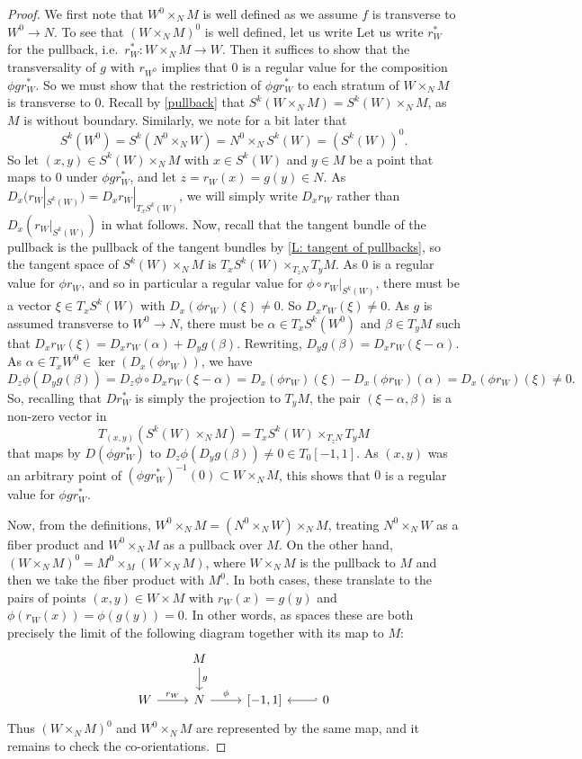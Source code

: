\documentclass[12pt]{article}
\theoremstyle{plain}
\theoremstyle{definition}
\theoremstyle{remark}
\begin{document}
\begin{proof}
	We first note that $W^0 \times_N M$ is well defined as we assume $f$ is transverse to $W^0 \to N$.
	To see that $(W \times_N M)^0$ is well defined, let us write Let us write $r_W^*$ for the pullback, i.e.\ $r_W^* \colon W \times_N M \to W$.
	Then it suffices to show that the transversality of $g$ with $r_{W^0}$ implies that $0$ is a regular value for the composition $\phi g r_W^*$.
	So we must show that the restriction of $\phi gr_W^*$ to each stratum of $W \times_N M$ is transverse to $0$.
	Recall by \cref{pullback} that $S^k(W \times_N M) = S^k(W) \times_N M$, as $M$ is without boundary.
	Similarly, we note for a bit later that $$S^k(W^0) = S^k(N^0 \times_N W) = N^0 \times_N S^k(W) = (S^k(W))^0.$$
	So let $(x,y) \in S^k(W) \times_N M$ with $x \in S^k(W)$ and $y \in M$ be a point that maps to $0$ under $\phi gr_W^*$, and let $z = r_W(x) = g(y) \in N$.
	As $D_x(r_W|_{S^k(W)}) = D_xr_W|_{T_xS^k(W)}$, we will simply write $D_xr_W$ rather than $D_x(r_W|_{S^k(W)})$ in what follows.
	Now, recall that the tangent bundle of the pullback is the pullback of the tangent bundles by \cref{L: tangent of pullbacks}, so the tangent space of $S^k(W) \times_N M$ is $T_x S^k(W) \times_{T_{z}N} T_yM$.
	As $0$ is a regular value for $\phi r_W$, and so in particular a regular value for $\phi \circ r_W|_{S^k(W)}$, there must be a vector $\xi \in T_xS^k(W)$ with $D_x(\phi r_W)(\xi)\neq 0$.
	So $D_xr_W(\xi) \neq 0$.
	As $g$ is assumed transverse to $W^0 \to N$, there must be $\alpha \in T_xS^k(W^0)$ and $\beta \in T_yM$ such that $D_xr_W(\xi) = D_xr_W(\alpha) + D_yg (\beta)$.
	Rewriting, $D_yg (\beta) = D_xr_W(\xi-\alpha)$.
	As $\alpha \in T_xW^0 \in \ker(D_x (\phi r_W))$, we have $$D_{z}\phi(D_yg (\beta)) = D_{z}\phi \circ D_xr_W(\xi-\alpha) = D_x(\phi r_W)(\xi)-D_x(\phi r_W)(\alpha) = D_x(\phi r_W)(\xi)\neq 0.$$
	So, recalling that $Dr_W^*$ is simply the projection to $T_yM$, the pair $( \xi-\alpha, \beta)$ is a non-zero vector in $$T_{(x,y)}(S^k(W) \times_N M) = T_x S^k(W) \times_{T_{z}N} T_yM$$ that maps by $D(\phi gr_W^*)$ to $D_{z}\phi(D_yg (\beta)) \neq 0 \in T_{0}[-1,1]$.
	As $(x,y)$ was an arbitrary point of $(\phi gr^*_{W})^{-1}(0) \subset W \times_N M$, this shows that $0$ is a regular value for $\phi gr^*_W$.

	Now, from the definitions, $W^0 \times_N M = (N^0 \times_N W) \times_N M$, treating $N^0 \times_N W$ as a fiber product and $W^0 \times_N M$ as a pullback over $M$.
	On the other hand, $(W \times_N  M)^0 = M^0 \times_M (W \times_N M)$, where $W \times_N M$ is the pullback to $M$ and then we take the fiber product with $M^0$.
	In both cases, these translate to the pairs of points $(x,y) \in W \times M$ with $r_W(x) = g(y)$ and $\phi(r_W(x)) = \phi(g(y)) = 0$.
	In other words, as spaces these are both precisely the limit of the following diagram together with its map to $M$:
	\[
	\begin{tikzcd}
		& M \arrow[d,"g"] & \\
		W \arrow[r, "r_W"] & N \arrow[r, "\phi"] & {[-1,1]} & \arrow[l,hook'] 0
	\end{tikzcd}
	\]
	Thus $(W \times_N M)^0$ and $W^0 \times_N M$ are represented by the same map, and it remains to check the co-orientations.


\end{proof}
\end{document}
